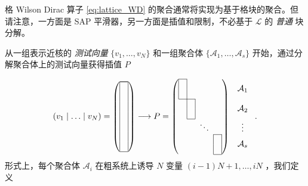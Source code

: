 \documentclass{siamltex}
\begin{document}
格 Wilson Dirac 算子    \eqref{eq:lattice_WD}    的聚合通常将实现为基于格块的聚合。但请注意，一方面是 SAP 平滑器，另一方面是插值和限制，不必基于    $\mathcal{L}$    的  {    \em    普通   }  块分解。

从一组表示近核的  {    \em    测试向量   }     $ \{  v_1,\ldots, v_N  \} $    和一组聚合体    $  \{  \mathcal{A}_1,\ldots, \mathcal{A}_s  \}  $    开始，通过分解聚合体上的测试向量获得插值    $P$

\begin{equation}\label{eq:aggInterpolation}
  (v_1 \mid \ldots \mid v_N) =
  \left( \begin{array}{|c|}
      \hline
      \cline{1-1}
      \multicolumn{1}{|c|}{} \\
      \multicolumn{1}{|c|}{} \\
      \multicolumn{1}{|c|}{} \\
      \multicolumn{1}{|c|}{} \\
      \multicolumn{1}{|c|}{} \\
      \multicolumn{1}{|c|}{} \\
      \multicolumn{1}{|c|}{} \\
      \hline
    \end{array} \right)
  \longrightarrow
  P = \left( \begin{array}{c c c c c c c c}
      \cline{1-1}
      \multicolumn{1}{|c|}{} &                        &        &                        \\
      \multicolumn{1}{|c|}{} &                        &        &                        \\
      \cline{1-2}
                             & \multicolumn{1}{|c|}{} &        &                        \\
                             & \multicolumn{1}{|c|}{} &        &                        \\
      \cline{2-2}
                             &                        & \ddots &                        \\
      \cline{4-4}
                             &                        &        & \multicolumn{1}{|c|}{} \\
                             &                        &        & \multicolumn{1}{|c|}{} \\
      \cline{4-4}
    \end{array} \right)
  \begin{array}{c}
    \multirow{2}{*}{        $\mathcal{A}_1$        } \\
    \\
    \multirow{2}{*}{        $\mathcal{A}_2$        } \\
    \\
    \vdots                                           \\
    \multirow{2}{*}{        $\mathcal{A}_s$        } \\
    \\
  \end{array}.
\end{equation}    形式上，每个聚合体    $\mathcal{A}_i$    在粗系统上诱导    $N$    变量    $(i-1)N+1,\ldots, iN$   ，我们定义
\end{document}

